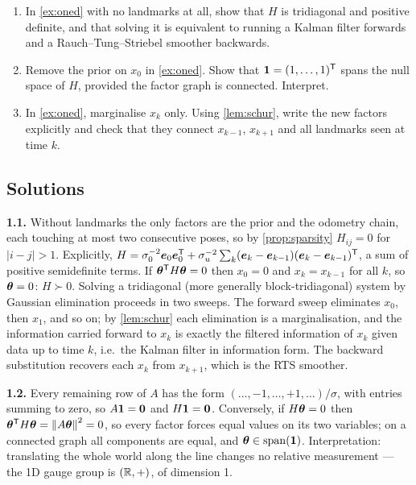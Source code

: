 \begin{enumerate}[label=\textbf{1.\arabic*},ref=1.\arabic*]
\item\label{ex:1tri} In \cref{ex:oned} with no landmarks at all, show
  that $H$ is tridiagonal and positive definite, and that solving it is
  equivalent to running a Kalman filter forwards and a
  Rauch--Tung--Striebel smoother backwards.
\item\label{ex:1gauge} Remove the prior on $x_0$ in \cref{ex:oned}. Show
  that $\bm{1}=(1,\dots,1)^{\mathsf{T}}$ spans the null space of $H$, provided the
  factor graph is connected. Interpret.
\item\label{ex:1marg} In \cref{ex:oned}, marginalise $x_k$ only. Using
  \cref{lem:schur}, write the new factors explicitly and check that they
  connect $x_{k-1}$, $x_{k+1}$ and all landmarks seen at time $k$.
\end{enumerate}

\subsection*{Solutions}

\textbf{1.1.} Without landmarks the only factors are the prior and the
odometry chain, each touching at most two consecutive poses, so by
\cref{prop:sparsity} $H_{ij}=0$ for $|i-j|>1$. Explicitly,
$H=\sigma_0^{-2}\bm{e}_0\bm{e}_0^{\mathsf{T}}+\sigma_u^{-2}\sum_k
(\bm{e}_k-\bm{e}_{k-1})(\bm{e}_k-\bm{e}_{k-1})^{\mathsf{T}}$, a sum of
positive semidefinite terms. If $\bm{\theta}^{\mathsf{T}} H\bm{\theta}=0$ then $x_0=0$ and
$x_k=x_{k-1}$ for all $k$, so $\bm{\theta}=0$: $H\succ0$. Solving a
tridiagonal (more generally block-tridiagonal) system by Gaussian
elimination proceeds in two sweeps. The forward sweep eliminates $x_0$,
then $x_1$, and so on; by \cref{lem:schur} each elimination is a
marginalisation, and the information carried forward to $x_k$ is exactly
the filtered information of $x_k$ given data up to time $k$, i.e.\ the
Kalman filter in information form. The backward substitution recovers
each $x_k$ from $x_{k+1}$, which is the RTS smoother.

\textbf{1.2.} Every remaining row of $A$ has the form
$(\dots,-1,\dots,+1,\dots)/\sigma$, with entries summing to zero, so
$A\bm{1}=\bm{0}$ and $H\bm{1}=\bm{0}$. Conversely, if
$H\bm{\theta}=0$ then $\bm{\theta}^{\mathsf{T}} H\bm{\theta}=\left\lVert A\bm{\theta}\right\rVert^2=0$, so every
factor forces equal values on its two variables; on a connected graph all
components are equal, and $\bm{\theta}\in\operatorname{span}(\bm{1})$.
Interpretation: translating the whole world along the line changes no
relative measurement --- the 1D gauge group is $(\mathbb{R},+)$, of dimension 1.


